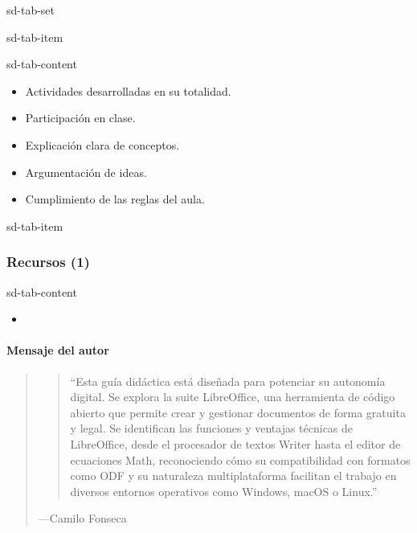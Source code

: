 \documentclass[letterpaper,10pt,spanish]{sphinxmanual}
\begin{document}
\begin{sphinxuseclass}{sd-tab-set}
\begin{sphinxuseclass}{sd-tab-item}
\begin{sphinxuseclass}{sd-tab-content}\begin{itemize}
\item {} 
\sphinxAtStartPar
Actividades desarrolladas en su totalidad.

\item {} 
\sphinxAtStartPar
Participación en clase.

\item {} 
\sphinxAtStartPar
Explicación clara de conceptos.

\item {} 
\sphinxAtStartPar
Argumentación de ideas.

\item {} 
\sphinxAtStartPar
Cumplimiento de las reglas del aula.

\end{itemize}

\end{sphinxuseclass}
\end{sphinxuseclass}
\begin{sphinxuseclass}{sd-tab-item}\subsubsection*{Recursos (1)}

\begin{sphinxuseclass}{sd-tab-content}\begin{itemize}
\item {} 
\sphinxAtStartPar
{\hyperref[\detokenize{cursos/ofimatica10/recursos/T03::doc}]{}}

\end{itemize}

\end{sphinxuseclass}
\end{sphinxuseclass}
\end{sphinxuseclass}

\paragraph{Mensaje del autor}
\label{\detokenize{cursos/ofimatica10/periodo01/G03:mensaje-del-autor}}\begin{quote}
\begin{quote}

\sphinxAtStartPar
“Esta guía didáctica está diseñada para potenciar su autonomía digital. Se explora la suite LibreOffice, una herramienta de código abierto que permite crear y gestionar documentos de forma gratuita y legal. Se identifican las funciones y ventajas técnicas de LibreOffice, desde el procesador de textos Writer hasta el editor de ecuaciones Math, reconociendo cómo su compatibilidad con formatos como ODF y su naturaleza multiplataforma facilitan el trabajo en diversos entornos operativos como Windows, macOS o Linux.”
\end{quote}

\begin{flushright}
---Camilo Fonseca
\end{flushright}
\end{quote}
\end{document}
